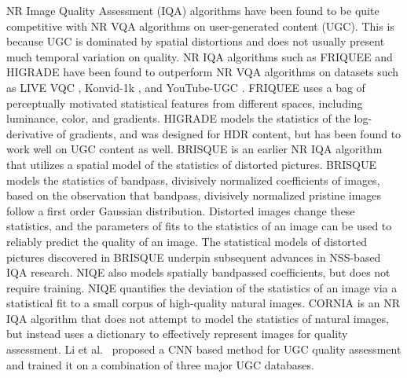 \documentclass[journal]{IEEEtran}
\begin{document}
NR Image Quality Assessment (IQA) algorithms have been found to be quite competitive with NR VQA algorithms on user-generated content (UGC). This is because UGC is dominated by spatial distortions and does not usually present much temporal variation on quality. NR IQA algorithms such as FRIQUEE \cite{friquee} and HIGRADE \cite{higrade} have been found to outperform NR VQA algorithms on datasets such as LIVE VQC \cite{vqc}, Konvid-1k \cite{konvid}, and YouTube-UGC \cite{konvid}. FRIQUEE uses a bag of perceptually motivated statistical features from different spaces, including luminance, color, and gradients. HIGRADE models the statistics of the log-derivative of gradients, and was designed for HDR content, but has been found to work well on UGC content as well. BRISQUE \cite{brisque} is an earlier NR IQA algorithm that utilizes a spatial model of the statistics of distorted pictures. BRISQUE models the statistics of bandpass, divisively normalized coefficients of images, based on the observation that bandpass, divisively normalized pristine images follow a first order Gaussian distribution. Distorted images change these statistics, and the parameters of fits to the statistics of an image can be used to reliably predict the quality of an image. The statistical models of distorted pictures discovered in BRISQUE underpin subsequent advances in NSS-based IQA research. NIQE \cite{niqe} also models spatially bandpassed coefficients, but does not require training. NIQE quantifies the deviation of the statistics of an image via a statistical fit to a small corpus of high-quality natural images. CORNIA \cite{cornia} is an NR IQA algorithm that does not attempt to model the statistics of natural images, but instead uses a dictionary to effectively represent images for quality assessment. Li et al.~\cite{dingquan} proposed a CNN based method for UGC quality assessment and trained it on a combination of three major UGC databases.
\end{document}
